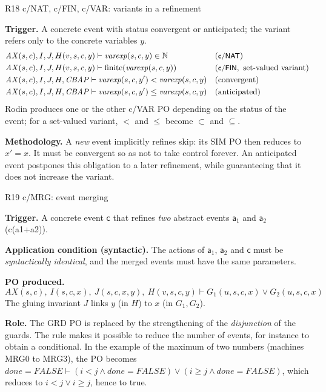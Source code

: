 \documentclass[11pt,a4paper]{article}
\newcommand{\nat}{\mathbb{N}}
\newcommand{\AX}{\mathit{AX}(s,c)}
\newcommand{\sff}[1]{\textsf{#1}}
\newcommand{\po}[1]{\textsf{\small #1}}
\newcommand{\champ}[1]{\par\smallskip\noindent\textbf{#1}\enspace}
\begin{document}
\begin{regle}{R18 \quad \po{c/NAT}, \po{c/FIN}, \po{c/VAR}: variants in a refinement}
  \champ{Trigger.} A concrete event with status convergent or anticipated; the
  variant refers only to the concrete variables $y$.
  \begin{align*}
    &\AX, I, J, H(v,s,c,y) \vdash \mathit{varexp}(s,c,y)\in\nat && (\po{c/NAT})\\
    &\AX, I, J, H(v,s,c,y) \vdash \mathrm{finite}(\mathit{varexp}(s,c,y)) && (\po{c/FIN}, \text{ set-valued variant})\\
    &\AX, I, J, H, \mathit{CBAP} \vdash \mathit{varexp}(s,c,y') < \mathit{varexp}(s,c,y) && (\text{convergent})\\
    &\AX, I, J, H, \mathit{CBAP} \vdash \mathit{varexp}(s,c,y') \le \mathit{varexp}(s,c,y) && (\text{anticipated})
  \end{align*}
  Rodin produces one or the other \po{c/VAR} PO depending on the status of the event;
  for a set-valued variant, $<$ and $\le$ become $\subset$ and $\subseteq$.
  \champ{Methodology.} A \emph{new} event implicitly refines \sff{skip}: its SIM PO
  then reduces to $x'=x$. It must be convergent so as not to take control forever.
  An anticipated event postpones this obligation to a later refinement, while
  guaranteeing that it does not increase the variant.
\end{regle}

\begin{regle}{R19 \quad \po{c/MRG}: event merging}
  \champ{Trigger.} A concrete event $\mathsf{c}$ that refines \emph{two} abstract
  events $\mathsf{a}_1$ and $\mathsf{a}_2$ (\sff{c(a1+a2)}).
  \champ{Application condition (syntactic).} The actions of $\mathsf{a}_1$,
  $\mathsf{a}_2$ and $\mathsf{c}$ must be \emph{syntactically identical}, and the merged
  events must have the same parameters.
  \champ{PO produced.}
  \[ \AX,\ I(s,c,x),\ J(s,c,x,y),\ H(v,s,c,y) \vdash G_1(u,s,c,x)\vee G_2(u,s,c,x) \]
  The gluing invariant $J$ links $y$ (in $H$) to $x$ (in $G_1,G_2$).
  \champ{Role.} The GRD PO is replaced by the strengthening of the
  \emph{disjunction} of the guards. The rule makes it possible to reduce the number
  of events, for instance to obtain a conditional. In the example of the maximum of
  two numbers (machines \sff{MRG0} to \sff{MRG3}), the PO becomes
  $done=\mathit{FALSE}\vdash(i<j\wedge done=\mathit{FALSE})\vee(i\ge j\wedge done=\mathit{FALSE})$,
  which reduces to $i<j\vee i\ge j$, hence to true.
\end{regle}
\end{document}
